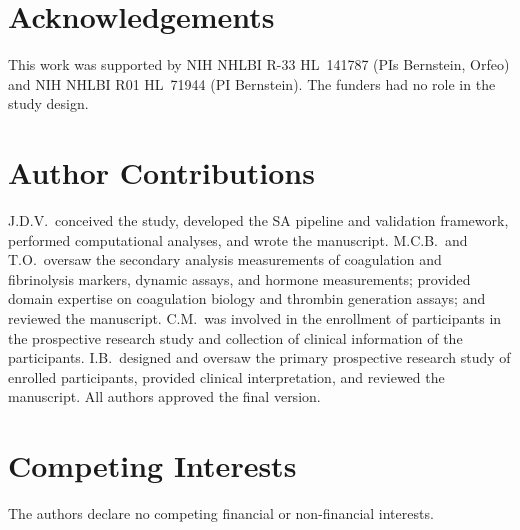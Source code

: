 \section*{Acknowledgements}
This work was supported by NIH NHLBI R-33 HL~141787 (PIs Bernstein, Orfeo) and
NIH NHLBI R01 HL~71944 (PI Bernstein). The funders had no role in the study design.

\section*{Author Contributions}
J.D.V.\ conceived the study, developed the SA pipeline and validation framework,
performed computational analyses, and wrote the manuscript. M.C.B.\ and T.O.\
oversaw the secondary analysis measurements of coagulation and fibrinolysis markers,
dynamic assays, and hormone measurements; provided domain expertise on coagulation
biology and thrombin generation assays; and reviewed the manuscript. C.M.\ was
involved in the enrollment of participants in the prospective research study and
collection of clinical information of the participants. I.B.\ designed and oversaw
the primary prospective research study of enrolled participants, provided clinical
interpretation, and reviewed the manuscript. All authors approved the final version.

\section*{Competing Interests}
The authors declare no competing financial or non-financial interests.

